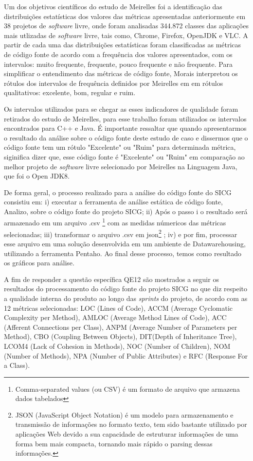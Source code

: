 Um dos objetivos científicos do estudo de Meirelles foi a identificação das distribuições estatísticas dos valores das métricas apresentadas anteriormente em 38 projetos de \textit{software} livre, onde foram analisadas 344.872 classes das aplicações mais utlizadas de \textit{software} livre, tais como, Chrome, Firefox, OpenJDK e VLC. A partir de cada uma das distribuições estatísticas foram classificadas as métricas de código fonte de acordo com a frequência dos valores apresentados,
com os intervalos: muito frequente, frequente, pouco frequente e não frequente. Para simplificar o entendimento das métricas de código fonte, Morais interpretou os rótulos dos
intervalos de frequência definidos por Meirelles em em rótulos qualitativos: excelente, bom, regular e ruim.


Os intervalos utilizados para se chegar as esses indicadores de qualidade foram retirados do
estudo de Meirelles, para esse trabalho foram utilizados os intervalos encontrados para C++ e Java. É importante ressaltar que quando apresentarmos o resultado da análise sobre o código fonte deste estudo de caso e dissermos que o código fonte tem um rótulo "Excelente" ou "Ruim" para determinada métrica, siginifica dizer que, esse código fonte é "Excelente" ou "Ruim" em comparação ao melhor projeto de \textit{software} livre selecionado por Meirelles na Linguagem Java, que foi o Open JDK8.



De forma geral, o processo realizado para a análise do código fonte do SICG consistiu em: i) executar a ferramenta de análise estática de código fonte, Analizo, sobre o código fonte do projeto SICG; ii) Após o passo i o resultado será armazenado em um arquivo .csv \footnote{Comma-separated values (ou CSV) é um formato de arquivo que armazena dados tabelados} com as medidas númericos das métricas selecionadas; iii) transformar o arquivo .csv em json\footnote{JSON (JavaScript Object Notation) é um modelo para armazenamento e transmissão de informações no formato texto, tem sido bastante utilizado por aplicações Web devido a sua capacidade de estruturar informações de uma forma bem mais compacta, tornando mais rápido o parsing dessas informações.} ; iv) e por fim, processar esse arquivo em uma solução desenvolvida em um ambiente de Datawarehousing, utilizando a ferramenta Pentaho. Ao final desse processo, temos como resultado os gráficos para análise. 

A fim de responder a questão específica QE12 são mostrados a seguir os resultados do processamento do código fonte do projeto SICG no que diz respeito a qualidade interna do produto ao longo das \textit{sprints} do projeto, 
de acordo com as 12 métricas selecionadas: LOC (Lines of Code), ACCM (Average Cyclomatic Complexity per Method), AMLOC (Average Method Lines of Code), ACC (Afferent Connections per Class), ANPM (Average Number of Parameters per Method),
CBO (Coupling Between Objects), DIT(Depth of Inheritance Tree), LCOM4 (Lack of Cohesion in Methods), NOC (Number of Children), NOM (Number of Methods), NPA (Number of Public Attributes) e RFC (Response For a Class).

